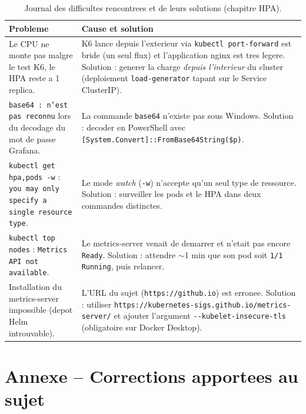 \documentclass[11pt,a4paper]{report}
\begin{document}
\begin{table}[h!]
\centering
\renewcommand{\arraystretch}{1.5}
\begin{tabular}{p{5.2cm} p{8.3cm}}
\toprule
\textbf{Probleme} & \textbf{Cause et solution} \\
\midrule
Le CPU ne monte pas malgre le test K6, le HPA reste a 1 replica. &
K6 lance depuis l'exterieur via \texttt{kubectl port-forward} est bride (un seul flux) et
l'application nginx est tres legere. Solution : generer la charge \emph{depuis l'interieur}
du cluster (deploiement \texttt{load-generator} tapant sur le Service ClusterIP). \\
\addlinespace
\texttt{base64 : n'est pas reconnu} lors du decodage du mot de passe Grafana. &
La commande \texttt{base64} n'existe pas sous Windows. Solution : decoder en PowerShell avec
\texttt{[System.Convert]::FromBase64String(\$p)}. \\
\addlinespace
\texttt{kubectl get hpa,pods -w} : \texttt{you may only specify a single resource type}. &
Le mode \emph{watch} (\texttt{-w}) n'accepte qu'un seul type de ressource. Solution :
surveiller les pods et le HPA dans deux commandes distinctes. \\
\addlinespace
\texttt{kubectl top nodes} : \texttt{Metrics API not available}. &
Le metrics-server venait de demarrer et n'etait pas encore \texttt{Ready}. Solution :
attendre $\sim$1 min que son pod soit \texttt{1/1 Running}, puis relancer. \\
\addlinespace
Installation du metrics-server impossible (depot Helm introuvable). &
L'URL du sujet (\texttt{https://github.io}) est erronee. Solution : utiliser
\texttt{https://kubernetes-sigs.github.io/metrics-server/} et ajouter l'argument
\texttt{-{}-kubelet-insecure-tls} (obligatoire sur Docker Desktop). \\
\bottomrule
\end{tabular}
\caption{Journal des difficultes rencontrees et de leurs solutions (chapitre HPA).}
\end{table}

\section*{Annexe -- Corrections apportees au sujet}
\end{document}
